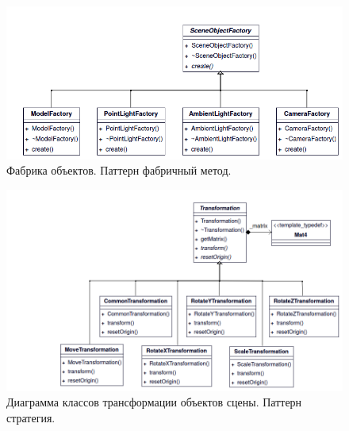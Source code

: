 \begin{figure}[H]
	\centering
	\begin{minipage}{1\textwidth}
		\centering
		\includegraphics[scale=0.65]{classes/factory.png}
		\caption{Фабрика объектов. Паттерн фабричный метод.}
		\label{class:factory}
	\end{minipage}%
\end{figure}

\begin{figure}[H]
	\begin{minipage}{1\textwidth}
		\centering
		\includegraphics[scale=0.65]{classes/transformation.png}
		\caption{Диаграмма классов трансформации объектов сцены. Паттерн стратегия.}
		\label{class:transformation}
	\end{minipage}%
\end{figure}